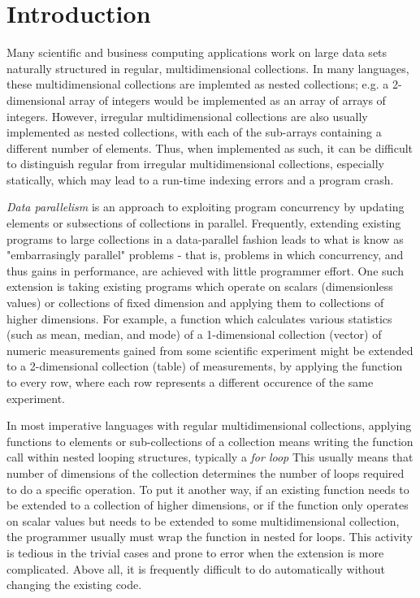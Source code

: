 \chapter{Introduction}
Many scientific and business computing applications work on large data sets naturally structured in regular, multidimensional collections.
In many languages, these multidimensional collections are implemted as nested collections; e.g. a 2-dimensional array of integers would be implemented as an array of arrays of integers.
However, irregular multidimensional collections are also usually implemented as nested collections, with each of the sub-arrays containing a different number of elements.
Thus, when implemented as such, it can be difficult to distinguish regular from irregular multidimensional collections, especially statically, which may lead to a run-time indexing errors and a program crash.

\textit{Data parallelism} is an approach to exploiting program concurrency by updating elements or subsections of collections in parallel.
Frequently, extending existing programs to large collections in a data-parallel fashion leads to what is know as "embarrasingly parallel" problems - that is, problems in which concurrency, and thus gains in performance, are achieved with little programmer effort.%
One such extension is taking existing programs which operate on scalars (dimensionless values) or collections of fixed dimension and applying them to collections of higher dimensions.
For example, a function which calculates various statistics (such as mean, median, and mode) of a 1-dimensional collection (vector) of numeric measurements gained from some scientific experiment might be extended to a 2-dimensional collection (table) of measurements, by applying the function to every row, where each row represents a different occurence of the same experiment.

In most imperative languages with regular multidimensional collections, applying functions to elements or sub-collections of a collection means writing the function call within nested looping structures, typically a \textit{for loop}
This usually means that number of dimensions of the collection determines the number of loops required to do a specific operation.
To put it another way, if an existing function needs to be extended to a collection of higher dimensions, or if the function only operates on scalar values but needs to be extended to some multidimensional collection, the programmer usually must wrap the function in nested for loops.
This activity is tedious in the trivial cases and prone to error when the extension is more complicated.
Above all, it is frequently difficult to do automatically without changing the existing code.

